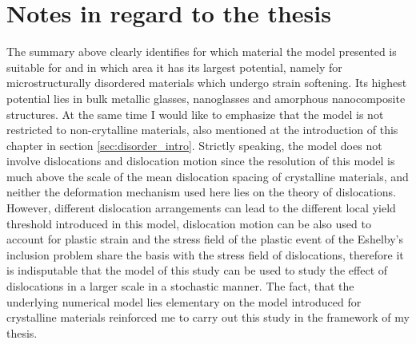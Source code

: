 \section*{Notes in regard to the thesis}
The summary above clearly identifies for which material the model presented is suitable for and in which area it has its largest potential, namely for microstructurally disordered materials which undergo strain softening. Its highest potential lies in bulk metallic glasses, nanoglasses and amorphous nanocomposite structures. At the same time I would like to emphasize that the model is not restricted to non-crytalline materials, also mentioned at the introduction of this chapter in section \ref{sec:disorder_intro}. Strictly speaking, the model does not involve dislocations and dislocation motion since the resolution of this model is much above the scale of the mean dislocation spacing of crystalline materials, and neither the deformation mechanism used here lies on the theory of dislocations. However, different dislocation arrangements can lead to the different local yield threshold introduced in this model, dislocation motion can be also used to account for plastic strain and the stress field of the plastic event of the Eshelby's inclusion problem share the basis with the stress field of dislocations, therefore it is indisputable that the model of this study can be used to study the effect of dislocations in a larger scale in a stochastic manner. The fact, that the underlying numerical model lies elementary on the model introduced for crystalline materials \cite{1742-5468-2005-08-P08004} reinforced me to carry out this study in the framework of my thesis.